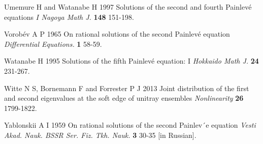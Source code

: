 \documentclass[12pt]{article}
\def\P{Painlev\'e }
\numberwithin{figure}{section}
\numberwithin{equation}{section}
\numberwithin{table}{section}
\begin{document}
\begin{thebibliography}{9}
  {Umemure H and Watanabe H} 1997 Solutions of the second and fourth \P equations $I$ {\it{Nagoya Math J.}} {\bf{148}} 151-198.

  {Vorob\'ev A P} 1965 On rational solutions of the second \P equation {\it{Differential Equations.}} {\bf{1}} 58-59.

  {Watanabe H} 1995 {Solutions of the fifth Painlev\'e equation: I} {\it{Hokkaido Math J.}} {\bf{24}} 231-267.

  {Witte N S, Bornemann F and Forrester P J} 2013 Joint distribution of the first and second eigenvalues at the soft edge of unitray ensembles {\it{Nonlinearity}} {\bf{26}} 1799-1822.

  {Yablonskii A I} 1959 On rational solutions of the second Painlev´e equation {\it{Vesti
Akad. Nauk. BSSR Ser. Fiz. Tkh. Nauk.}} {\bf{3}} 30-35 [in Russian].



\end{thebibliography}
\end{document}
